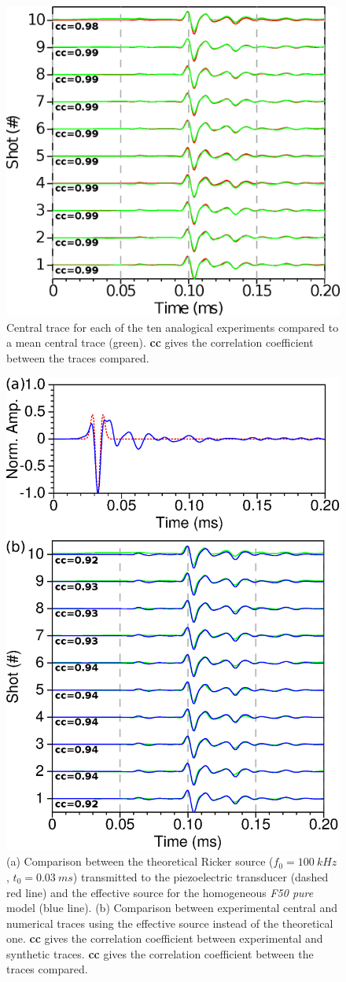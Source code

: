 \documentclass[extra,mreferee]{gji}
\begin{document}
\clearpage
\newpage

\begin{figure}
\centering
\includegraphics[width=0.50\columnwidth]{Fig/Fig09.eps}
\caption{Central trace for each of the ten analogical experiments compared to a mean central trace (green). \textbf{cc} gives the correlation coefficient between the traces compared.}
\label{Fig:Fig09}
\end{figure}

\clearpage
\newpage

\begin{figure}
\centering
\includegraphics[width=0.50\columnwidth]{Fig/Fig10.eps}
\caption{(a) Comparison between the theoretical Ricker source ($f_{0}=100\ kHz$, $t_{0}=0.03\ ms$) transmitted to the piezoelectric transducer (dashed red line) and the effective source for the homogeneous \textit{F50 pure} model (blue line). (b) Comparison between experimental central and numerical traces using the effective source instead of the theoretical one. \textbf{cc} gives the correlation coefficient between experimental and synthetic traces. \textbf{cc} gives the correlation coefficient between the traces compared.}
\label{Fig:Fig10}
\end{figure}
\end{document}
